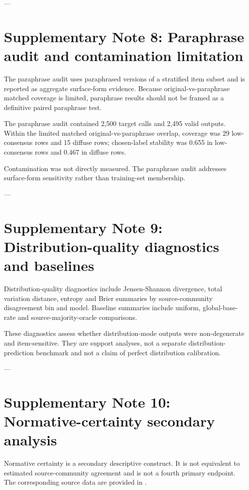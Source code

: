\documentclass[11pt]{article}
\begin{document}
---

\section{Supplementary Note 8: Paraphrase audit and contamination limitation}

The paraphrase audit uses paraphrased versions of a stratified item subset and is reported as aggregate surface-form evidence. Because original-vs-paraphrase matched coverage is limited, paraphrase results should not be framed as a definitive paired paraphrase test.

The paraphrase audit contained 2,500 target calls and 2,495 valid outputs. Within the limited matched original-vs-paraphrase overlap, coverage was 29 low-consensus rows and 15 diffuse rows; chosen-label stability was 0.655 in low-consensus rows and 0.467 in diffuse rows.

Contamination was not directly measured. The paraphrase audit addresses surface-form sensitivity rather than training-set membership.

---

\section{Supplementary Note 9: Distribution-quality diagnostics and baselines}

Distribution-quality diagnostics include Jensen-Shannon divergence, total variation distance, entropy and Brier summaries by source-community disagreement bin and model. Baseline summaries include uniform, global-base-rate and source-majority-oracle comparisons.

These diagnostics assess whether distribution-mode outputs were non-degenerate and item-sensitive. They are support analyses, not a separate distribution-prediction benchmark and not a claim of perfect distribution calibration.

---

\section{Supplementary Note 10: Normative-certainty secondary analysis}

Normative certainty is a secondary descriptive construct. It is not equivalent to estimated source-community agreement and is not a fourth primary endpoint. The corresponding source data are provided in .
\end{document}
